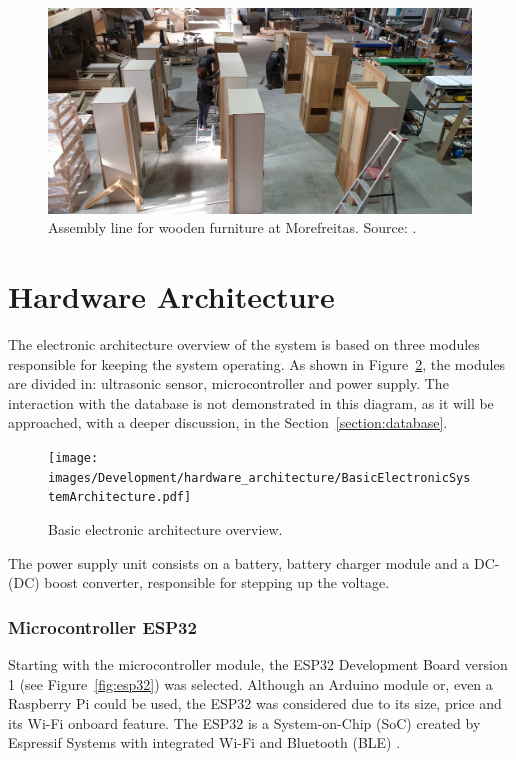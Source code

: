 \begin{figure}[h!]
    \centering
    \includegraphics[width=.65\linewidth]{images/Development/chap4/mofreitas.png}
    \caption{Assembly line for wooden furniture at Morefreitas. Source: \cite{noauthor_mofreita_2020}.}
    \label{fig:shopFloor}
\end{figure}




\section{Hardware Architecture}\label{section:hardwareArchitecture}

The electronic architecture overview of the system is based on three modules responsible for keeping the system operating. As shown in Figure~\ref{fig:basicElectronicArchitecture}, the modules are divided in: ultrasonic sensor, microcontroller and power supply. The interaction with the database is not demonstrated in this diagram, as it will be approached, with a deeper discussion, in the Section~\ref{section:database}.

\begin{figure}[h!]
    \centering
    \texttt{[image: images/Development/hardware\_architecture/BasicElectronicSystemArchitecture.pdf]}
    \caption{Basic electronic architecture overview.}
    \label{fig:basicElectronicArchitecture}
\end{figure}

The power supply unit consists on a battery, battery charger module and a \gls{DC}-(\gls{DC}) boost converter, responsible for stepping up the voltage.


\subsubsection{Microcontroller ESP32}

Starting with the microcontroller module, the ESP32 Development Board version 1 (see Figure~\ref{fig:esp32}) was selected. Although an Arduino module or, even a Raspberry Pi could be used, the ESP32 was considered due to its size, price and its Wi-Fi onboard feature. The ESP32 is a System-on-Chip (SoC) created by Espressif Systems with integrated Wi-Fi and Bluetooth (BLE) \cite{KURNIAWAN:2019}.

